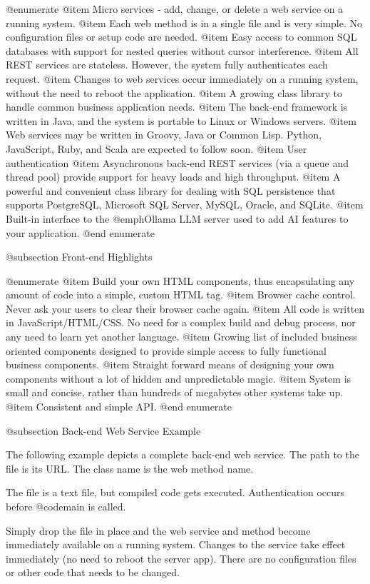 @enumerate
@item
Micro services - add, change, or delete a web service on a running system.
@item
Each web method is in a single file and is very simple.  No
configuration files or setup code are needed.
@item
Easy access to common SQL databases with support for nested queries
without cursor interference.
@item
All REST services are stateless.  However, the system fully
authenticates each request.
@item
Changes to web services occur immediately on a running system,
without the need to reboot the application.
@item
A growing class library to handle common business application needs.
@item
The back-end framework is written in Java, and the system is portable to
Linux or Windows servers.
@item
Web services may be written in Groovy, Java or Common Lisp.  Python,
JavaScript, Ruby, and Scala are expected to follow soon.
@item
User authentication
@item
Asynchronous back-end REST services (via a queue and thread pool)
provide support for heavy loads and high throughput.
@item
A powerful and convenient class library for dealing with SQL persistence that
supports PostgreSQL, Microsoft SQL Server, MySQL, Oracle, and SQLite.
@item
Built-in interface to the @emph{Ollama} LLM server used to add AI features to your application.
@end enumerate


@subsection Front-end Highlights

@enumerate
@item
Build your own HTML components, thus encapsulating any amount of code
into a simple, custom HTML tag.
@item
Browser cache control.  Never ask your users to clear their browser cache again.
@item
All code is written in JavaScript/HTML/CSS.  No need for a complex build
and debug process, nor any need to learn yet another language.
@item
Growing list of included business oriented components designed to
provide simple access to fully functional business components.
@item
Straight forward means of designing your own components without a lot
of hidden and unpredictable magic.
@item
System is small and concise, rather than hundreds of megabytes other
systems take up.
@item
Consistent and simple API.
@end enumerate

@subsection Back-end Web Service Example


The following example depicts a complete back-end web service.  The
path to the file is its URL.  The class name is the web method name.

The file is a text file, but compiled code gets executed.
Authentication occurs before @code{main} is called.

Simply drop the file in place and the web service and method become
immediately available on a running system.  Changes to the service
take effect immediately (no need to reboot the server app).  There are
no configuration files or other code that needs to be changed.


